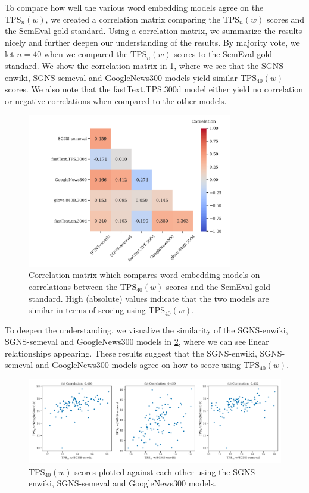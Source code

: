 To compare how well the various word embedding models agree on the $\text{TPS}_n(w)$, we created a correlation matrix comparing the $\text{TPS}_n(w)$ scores and the SemEval gold standard. Using a correlation matrix, we summarize the results nicely and further deepen our understanding of the results. By majority vote, we let $n=40$ when we compared the $\text{TPS}_n(w)$ scores to the SemEval gold standard. We show the correlation matrix in \cref{fig:correlation-matrix-tps-vs-gs}, where we see that the SGNS-enwiki, SGNS-semeval and GoogleNews300 models yield similar $\text{TPS}_{40}(w)$ scores. We also note that the fastText.TPS.300d model either yield no correlation or negative correlations when compared to the other models.
\begin{figure}[H]
    \centering
    \includegraphics[width=0.8\textwidth]{thesis/figures/correlation-matrix-tps-vs-gs.pdf}
    \caption{Correlation matrix which compares word embedding models on correlations between the $\text{TPS}_{40}(w)$ scores and the SemEval gold standard. High (absolute) values indicate that the two models are similar in terms of scoring using $\text{TPS}_{40}(w)$.}
    \label{fig:correlation-matrix-tps-vs-gs}
\end{figure}

To deepen the understanding, we visualize the similarity of the SGNS-enwiki, SGNS-semeval and GoogleNews300 models in \cref{fig:tps-vs-gs-top-3-correlation-word-embedding-models}, where we can see linear relationships appearing. These results suggest that the SGNS-enwiki, SGNS-semeval and GoogleNews300 models agree on how to score using $\text{TPS}_{40}(w)$.
\begin{figure}[H]
    \centering
    \includegraphics[width=\textwidth]{thesis/figures/tps-vs-gs-top-3-correlation-word-embedding-models.pdf}
    \caption{$\text{TPS}_{40}(w)$ scores plotted against each other using the SGNS-enwiki, SGNS-semeval and GoogleNews300 models.}
    \label{fig:tps-vs-gs-top-3-correlation-word-embedding-models}
\end{figure}

